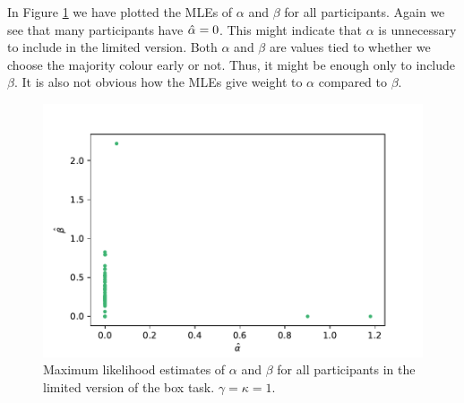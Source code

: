 In Figure \ref{fig:mles_limited_alpha_beta} we have plotted the MLEs of $\alpha$ and $\beta$ for all participants. Again we see that many participants have $\hat{\alpha}=0$. This might indicate that $\alpha$ is unnecessary to include in the limited version. Both $\alpha$ and $\beta$ are values tied to whether we choose the majority colour early or not. Thus, it might be enough only to include $\beta$. It is also not obvious how the MLEs give weight to $\alpha$ compared to $\beta$.
 
\begin{figure}
    \centering
    \includegraphics[scale=0.7]{pictures/plotted_mles_limited_alpha_beta_gk1.pdf}
    \caption[MLEs of $\alpha$ and $\beta$, limited. $\gamma=\kappa=1$]{Maximum likelihood estimates of $\alpha$ and $\beta$ for all participants in the limited version of the box task. $\gamma=\kappa=1$.}
    \label{fig:mles_limited_alpha_beta}
\end{figure}



